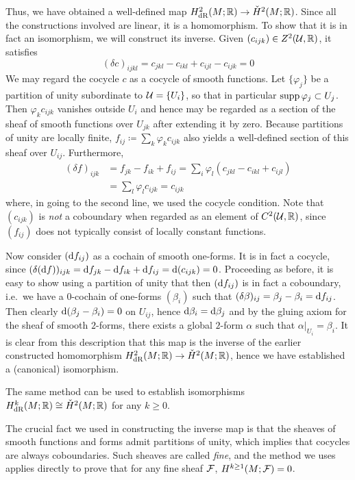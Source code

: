 \documentclass[parskip=half]{scrartcl}
\begin{document}
\begin{myproof}
	Thus, we have obtained a well-defined map $H^2_\text{dR}(M;\mathbb{R})\to \check H^2(M;\mathbb{R})$. Since all the constructions involved are linear, it is a homomorphism. To show that it is in fact an isomorphism, we will construct its inverse. Given $(c_{ijk})\in Z^2(\mathcal{U},\mathbb{R})$, it satisfies
	\begin{equation*}
		(\delta c)_{ijkl}=c_{jkl}-c_{ikl}+c_{ijl}-c_{ijk}=0
	\end{equation*}
	We may regard the cocycle $c$ as a cocycle of smooth functions. Let $\{\varphi_j\}$ be a partition of unity subordinate to $\mathcal{U}=\{U_i\}$, so that in particular $\operatorname{supp} \varphi_j\subset U_j$. Then $\varphi_k c_{ijk}$ vanishes outside $U_i$ and hence may be regarded as a section of the sheaf of smooth functions over $U_{jk}$ after extending it by zero. Because partitions of unity are locally finite, $f_{ij}\coloneqq \sum_k \varphi_k c_{ijk}$ also yields a well-defined section of this sheaf over $U_{ij}$. Furthermore,
	\begin{align*}
		(\delta f)_{ijk}&=f_{jk}-f_{ik}+f_{ij}=\sum_i \varphi_l(c_{jkl}-c_{ikl} + c_{ijl})\\
		&=\sum_l \varphi_l c_{ijk}=c_{ijk}
	\end{align*}
	where, in going to the second line, we used the cocycle condition. Note that $(c_{ijk})$ is \emph{not} a coboundary when regarded as an element of $C^2(\mathcal{U},\mathbb{R})$, since $(f_{ij})$ does not typically consist of locally constant functions.
	
	Now consider $(\mathrm{d} f_{ij})$ as a cochain of smooth one-forms. It is in fact a cocycle, since $(\delta (\mathrm{d} f))_{ijk}=\mathrm{d} f_{jk}-\mathrm{d} f_{ik}+ \mathrm{d} f_{ij}=\mathrm{d} (c_{ijk})=0$. Proceeding as before, it is easy to show using a partition of unity that then $(\mathrm{d} f_{ij})$ is in fact a coboundary, i.e.~we have a $0$-cochain of one-forms $(\beta_i)$ such that $(\delta \beta)_{ij}=\beta_j-\beta_i=\mathrm{d} f_{ij}$. Then clearly $\mathrm{d}(\beta_j-\beta_i)=0$ on $U_{ij}$, hence $\mathrm{d} \beta_i=\mathrm{d}\beta_j$ and by the gluing axiom for the sheaf of smooth $2$-forms, there exists a global $2$-form $\alpha$ such that $\alpha|_{U_i}=\beta_i$. It is clear from this description that this map is the inverse of the earlier constructed homomorphism $H^2_\text{dR}(M;\mathbb{R})\to \check H^2(M;\mathbb{R})$, hence we have established a (canonical) isomorphism.
\end{myproof}

\begin{rem}\leavevmode
	\begin{numberedlist}
		\item The same method can be used to establish isomorphisms $H^k_\text{dR}(M;\mathbb{R})\cong \check H^2(M;\mathbb{R})$ for any $k\geq 0$. 
		\item The crucial fact we used in constructing the inverse map is that the sheaves of smooth functions and forms admit partitions of unity, which implies that cocycles are always coboundaries. Such sheaves are called \emph{fine}, and the method we uses applies directly to prove that for any fine sheaf $\mathcal{F}$, $H^{k\geq 1}(M;\mathcal{F})=0$.
	\end{numberedlist}
\end{rem}
\end{document}
